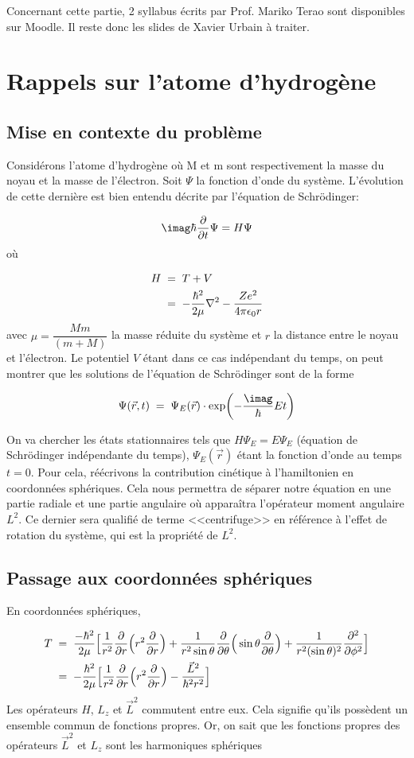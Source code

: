 Concernant cette partie, 2 syllabus écrits par Prof. Mariko Terao sont disponibles sur Moodle. Il reste donc les slides de Xavier Urbain à traiter.

\newpage
\section{Rappels sur l'atome d'hydrogène}
\subsection{Mise en contexte du problème}

Considérons l'atome d'hydrogène où M et m sont respectivement la masse du noyau et la masse de l'électron. Soit $\Psi$ la fonction d'onde du système. L'évolution de cette dernière est bien entendu décrite par l'équation de Schrödinger:

$$\imag\hbar \dfrac{\partial}{\partial t}\Psi=H\Psi$$
où

\begin{align}
H&\; = \; T+V \\
&\; = \; -\dfrac{\hbar^2}{2\mu}\nabla^2-\dfrac{Ze^2}{4\pi \epsilon_0 r}
\end{align}
avec $\mu=\dfrac{Mm}{(m+M)}$ la masse réduite du système et $r$ la distance entre le noyau et l'électron. Le potentiel $V$ étant dans ce cas indépendant du temps, on peut montrer que les solutions de l'équation de Schrödinger sont de la forme

\[
    \Psi(\Vec{r},t) \eq \Psi_E(\Vec{r}) \cdot \exp(-\dfrac{\imag}{\hbar}Et)
\]

On va chercher les états stationnaires tels que $H\Psi_E=E\Psi_E$ (équation de Schrödinger indépendante du temps), $\Psi_E(\Vec{r})$ étant la fonction d'onde au temps $t=0$. Pour cela, réécrivons la contribution cinétique à l'hamiltonien en coordonnées sphériques. Cela nous permettra de séparer notre équation en une partie radiale et une partie angulaire où apparaîtra l'opérateur moment angulaire $L^2$. Ce dernier sera qualifié de terme <<centrifuge>> en référence à l'effet de rotation du système, qui est la propriété de $L^2$.

\subsection{Passage aux coordonnées sphériques}
En coordonnées sphériques,

\begin{align*}
    T&\; = \;
    \dfrac{-\hbar^2}{2\mu}\Big[\dfrac{1}{r^2}\dfrac{\partial}{\partial r}\Big(r^2\dfrac{\partial}{\partial r}\Big)+\dfrac{1}{r^2\sin{\theta}}\dfrac{\partial}{\partial \theta}\Big(\sin{\theta}\dfrac{\partial}{\partial \theta}\Big)+\dfrac{1}{r^2(\sin{\theta})^2}\dfrac{\partial ^2}{\partial\phi^2}\Big]\\
    &\; = \;-\dfrac{\hbar^2}{2\mu}\Big[\dfrac{1}{r^2}\dfrac{\partial}{\partial r}\Big(r^2\dfrac{\partial}{\partial r}\Big)-\dfrac{\Vec{L}^2}{\hbar^2r^2}\Big]
\end{align*}
Les opérateurs $H$, $L_z$ et $\vec{L}^2$ commutent entre eux. Cela signifie qu'ils possèdent un ensemble commun de fonctions propres. Or, on sait que les fonctions propres des opérateurs $\Vec{L}^2$ et $L_z$ sont les harmoniques sphériques

